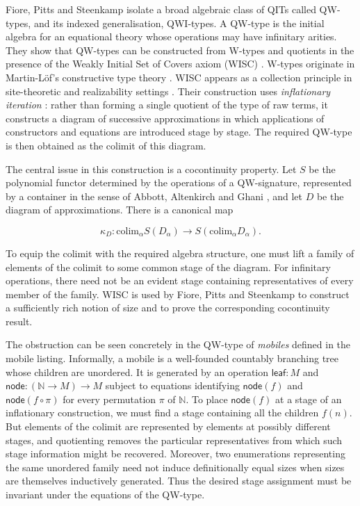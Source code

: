 \documentclass[runningheads]{llncs}
\begin{document}
Fiore, Pitts and Steenkamp isolate a broad algebraic class of QITs
called QW-types, and its indexed generalisation, QWI-types. A QW-type is
the initial algebra for an equational theory whose operations may have
infinitary arities. They show that QW-types can be constructed from
W-types and quotients in the presence of the Weakly Initial Set of
Covers axiom (WISC) \citep{fiore2022-quotient-inductive}. W-types
originate in Martin-Löf's constructive type theory
\citep{martin-lof1984-mltt}. WISC appears as a collection principle in
site-theoretic and realizability settings
\citep{roberts2012-internal-categories, streicher2005-wisc}. Their
construction uses \emph{inflationary iteration}
\citep{pitts2022-inflationary-iteration}: rather than forming a single
quotient of the type of raw terms, it constructs a diagram of successive
approximations in which applications of constructors and equations are
introduced stage by stage. The required QW-type is then obtained as the
colimit of this diagram.

The central issue in this construction is a cocontinuity property. Let
\(S\) be the polynomial functor determined by the operations of a
QW-signature, represented by a container in the sense of Abbott,
Altenkirch and Ghani \citep{abbott2005-container-derivative}, and let
\(D\) be the diagram of approximations. There is a canonical map

\[
\kappa_D :
\mathrm{colim}_\alpha S (D_\alpha)
\longrightarrow
S \left(\mathrm{colim}_\alpha D_\alpha\right).
\]

To equip the colimit with the required algebra structure, one must lift
a family of elements of the colimit to some common stage of the diagram.
For infinitary operations, there need not be an evident stage containing
representatives of every member of the family. WISC is used by Fiore,
Pitts and Steenkamp to construct a sufficiently rich notion of size and
to prove the corresponding cocontinuity result.

The obstruction can be seen concretely in the QW-type of \emph{mobiles}
defined in the mobile listing. %
Informally, a mobile is a well-founded countably branching tree whose
children are unordered. It is generated by an operation
\(\mathsf{leaf}:M\) and
\(\mathsf{node} : (\mathbb{N} \to M) \to M\) subject to equations
identifying \(\mathsf{node} (f)\) and \(\mathsf{node} (f \circ \pi)\)
for every permutation \(\pi\) of \(\mathbb{N}\). To place
\(\mathsf{node} (f)\) at a stage of an inflationary construction, we
must find a stage containing all the children \(f (n)\). But elements of
the colimit are represented by elements at possibly different stages,
and quotienting removes the particular representatives from which such
stage information might be recovered. Moreover, two enumerations
representing the same unordered family need not induce definitionally
equal sizes when sizes are themselves inductively generated. Thus the
desired stage assignment must be invariant under the equations of the
QW-type.
\end{document}

